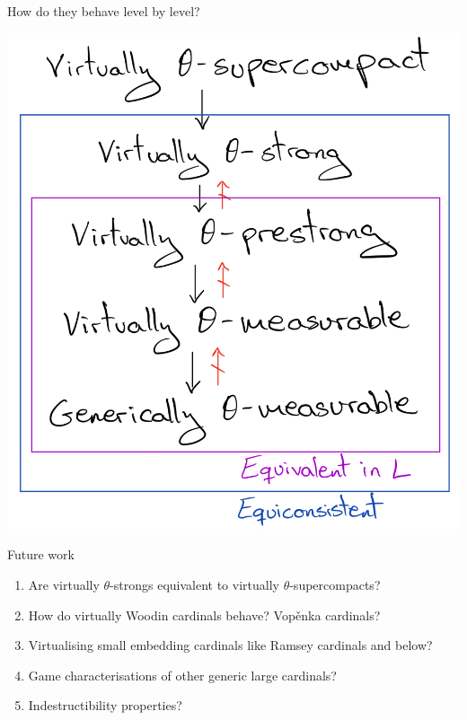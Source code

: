 \documentclass{beamer}
\begin{document}
\begin{frame}{How do they behave level by level?}
  \begin{center}
    \includegraphics[scale=.18]{gfx/lbl_virtual.jpg}
  \end{center}
\end{frame}

\begin{frame}{Future work}
  \begin{enumerate}
    \item Are virtually $\theta$-strongs equivalent to virtually $\theta$-supercompacts?
    \pause\item How do virtually Woodin cardinals behave? \pause Vop\v enka cardinals?
    \pause\item Virtualising small embedding cardinals like Ramsey cardinals and below?
    \pause\item Game characterisations of other generic large cardinals?
    \pause\item Indestructibility properties?
  \end{enumerate}
\end{frame}
\end{document}
